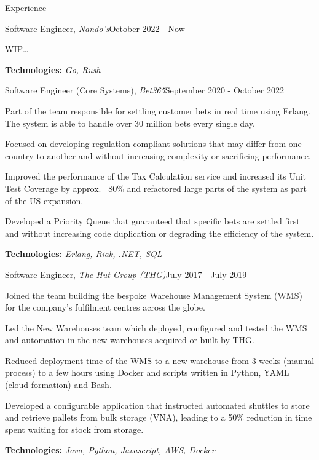\documentclass{resume}
\begin{document}
\begin{rSection}{Experience}

    \begin{rSubsection}{Software Engineer, \textit{Nando's}}{October 2022 - Now}{}{}
        \item WIP\ldots
        \item \textbf{Technologies:} \textit{Go, Rush}
    \end{rSubsection}

    \begin{rSubsection}{Software Engineer (Core Systems), \textit{Bet365}}{September 2020 - October 2022}{}{}
        \item Part of the team responsible for settling customer bets in real time using Erlang. The system is able to handle over 30 million bets every single day.
        \item Focused on developing regulation compliant solutions that may differ from one country to another and without increasing complexity or sacrificing performance.
        \item Improved the performance of the Tax Calculation service and increased its Unit Test Coverage by approx. ~80\% and refactored large parts of the system as part of the US expansion.
        \item Developed a Priority Queue that guaranteed that specific bets are settled first and without increasing code duplication or degrading the efficiency of the  system.
        \item \textbf{Technologies:} \textit{Erlang, Riak, .NET, SQL}
    \end{rSubsection}

    \begin{rSubsection}{Software Engineer, \textit{The Hut Group (THG)}}{July 2017 - July 2019}{}{}
        \item Joined the team building the bespoke Warehouse Management System (WMS) for the company's fulfilment centres across the globe.
        \item Led the New Warehouses team which deployed, configured and tested the WMS and automation in the new warehouses acquired or built by THG.
        \item Reduced deployment time of the WMS to a new warehouse from 3 weeks (manual process) to a few hours using Docker and scripts written in Python, YAML (cloud formation) and Bash.
        \item Developed a configurable application that instructed automated shuttles to store and retrieve pallets from bulk storage (VNA), leading to a 50\% reduction in time spent waiting for stock from storage.
        \item \textbf{Technologies:} \textit{Java, Python, Javascript, AWS, Docker}
    \end{rSubsection}

\end{rSection}
\end{document}
